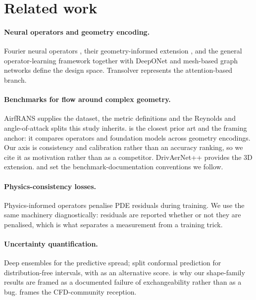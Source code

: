 \section{Related work}
\label{sec:related}

\paragraph{Neural operators and geometry encoding.}
Fourier neural operators \citep{li2021fno}, their geometry-informed extension
\citep{li2023gino}, and the general operator-learning framework
\citep{kovachki2023neuraloperator} together with DeepONet \citep{lu2021deeponet}
and mesh-based graph networks \citep{pfaff2021meshgraphnets} define the design
space. Transolver \citep{wu2024transolver} represents the attention-based branch.

\paragraph{Benchmarks for flow around complex geometry.}
AirfRANS \citep{bonnet2022airfrans} supplies the dataset, the metric definitions
and the Reynolds and angle-of-attack splits this study inherits.
\citet{rabeh2025benchmarking} is the closest prior art and the framing anchor: it
compares operators and foundation models across geometry encodings. Our axis is
consistency and calibration rather than an accuracy ranking, so we cite it as
motivation rather than as a competitor. DrivAerNet++ \citep{elrefaie2024drivaernetpp}
provides the 3D extension. \citet{takamoto2022pdebench} and
\citet{ohana2024thewell} set the benchmark-documentation conventions we follow.

\paragraph{Physics-consistency losses.}
Physics-informed operators \citep{li2021pino} penalise PDE residuals during
training. We use the same machinery diagnostically: residuals are reported
whether or not they are penalised, which is what separates a measurement from
a training trick.

\paragraph{Uncertainty quantification.}
Deep ensembles \citep{lakshminarayanan2017ensembles} for the predictive spread;
split conformal prediction \citep{angelopoulos2021gentle, vovk2005algorithmic,
lei2018distributionfree} for distribution-free intervals, with
\citet{romano2019cqr} as an alternative score. \citet{tibshirani2019covariateshift}
is why our shape-family results are framed as a documented failure of
exchangeability rather than as a bug.
\citet{vinuesa2022enhancing} frames the CFD-community reception.

